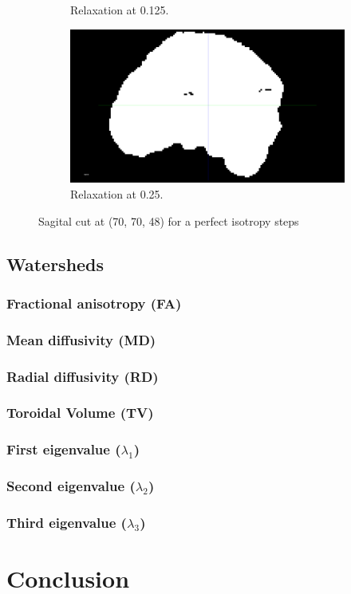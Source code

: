 \documentclass[a4paper,11pt]{report}
\begin{document}
\begin{figure}[H]
\begin{subfigure}[t]{.49\textwidth}
          \caption{Relaxation at 0.125.}
          \label{subfig:perf-iso-0125}
        \end{subfigure}\hfill%
        \begin{subfigure}[t]{.49\textwidth}
          \includegraphics[width=1\linewidth]{imgs/eg_00_00_00_025.png}
          \caption{Relaxation at 0.25.}
          \label{subfig:perf-iso-025}
        \end{subfigure}

        \caption{Sagital cut at (70, 70, 48) for a perfect isotropy steps}
      \end{figure}

  \section{Watersheds}
    \subsection{Fractional anisotropy (FA)}
    \subsection{Mean diffusivity (MD)}
    \subsection{Radial diffusivity (RD)}
    \subsection{Toroidal Volume (TV)}
    \subsection{First eigenvalue ($\lambda_1$)}
    \subsection{Second eigenvalue ($\lambda_2$)}
    \subsection{Third eigenvalue ($\lambda_3$)}

\chapter{Conclusion}
\end{document}
